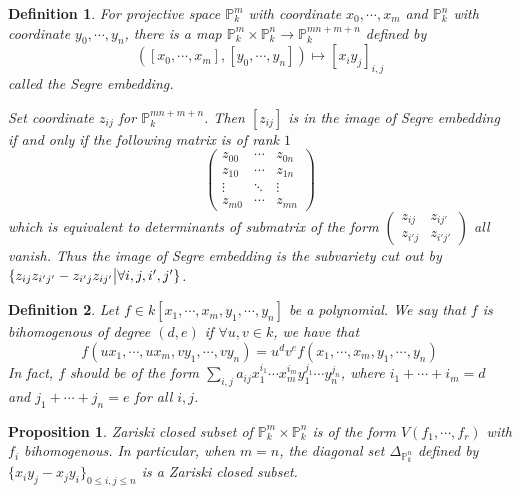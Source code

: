 \documentclass{ctexart}
\newtheorem{definition}{Definition}[section]
\newtheorem{proposition}{Proposition}[section]
\begin{document}
\begin{definition}
    For projective space $\mathbb{P}_{k}^{m}$ with coordinate $x_{0}, \cdots, x_{m}$ and $\mathbb{P}_{k}^{n}$ with coordinate $y_{0}, \cdots, y_{n}$,
    there is a map $\mathbb{P}_{k}^{m} \times \mathbb{P}_{k}^{n} \rightarrow \mathbb{P}_{k}^{mn + m + n}$ defined by
    \begin{equation}
        ([x_{0}, \cdots, x_{m}], [y_{0}, \cdots, y_{n}]) \longmapsto [x_{i}y_{j}]_{i, j}
    \end{equation}
    called the Segre embedding.
    \par
    Set coordinate $z_{ij}$ for $\mathbb{P}_{k}^{mn + m + n}$.
    Then $[z_{ij}]$ is in the image of Segre embedding if and only if the following matrix is of rank $1$
    \begin{equation}
        \begin{pmatrix}
            z_{00} & \cdots & z_{0n} \\
            z_{10} & \cdots & z_{1n} \\
            \vdots & \ddots & \vdots \\
            z_{m0} & \cdots & z_{mn} 
        \end{pmatrix}
    \end{equation}
    which is equivalent to determinants of submatrix of the form
    $
    \begin{pmatrix}
        z_{ij} & z_{ij'} \\
        z_{i'j} & z_{i'j'} 
    \end{pmatrix}
    $
    all vanish.
    Thus the image of Segre embedding is the subvariety cut out by $\{z_{ij}z_{i'j'} - z_{i'j}z_{ij'} \big{|} \forall i, j, i', j'\}$.
\end{definition}
\begin{definition}
    Let $f\in k[x_{1}, \cdots, x_{m}, y_{1}, \cdots, y_n]$ be a polynomial.
    We say that $f$ is bihomogenous of degree $(d, e)$ if $\forall u,v\in k$, we have that 
    \begin{equation}
        f(ux_{1}, \cdots, ux_{m}, vy_{1}, \cdots, vy_n) = u^{d}v^{e}f(x_{1}, \cdots, x_{m}, y_{1}, \cdots, y_{n})
    \end{equation}
    In fact, $f$ should be of the form $\sum_{i, j} a_{ij}x_{1}^{i_{1}}\cdots x_{m}^{i_{m}}y_{1}^{j_{1}}\cdots y_{n}^{j_{n}}$,
    where $i_{1} + \cdots + i_{m} = d$ and $j_{1} + \cdots + j_{n} = e$ for all $i, j$.
\end{definition}
\begin{proposition}
    Zariski closed subset of $\mathbb{P}_{k}^{m} \times \mathbb{P}_{k}^{n}$ is of the form $V(f_{1}, \cdots, f_{r})$ with $f_{i}$ bihomogenous.
    In particular, when $m = n$, the diagonal set $\Delta_{\mathbb{P}_{k}^{n}}$ defined by $\{x_{i}y_{j} - x_{j}y_{i}\}_{0 \le i,j \le n}$ is a Zariski closed subset.
    \label{Proposition 3.1}
\end{proposition}
\end{document}
